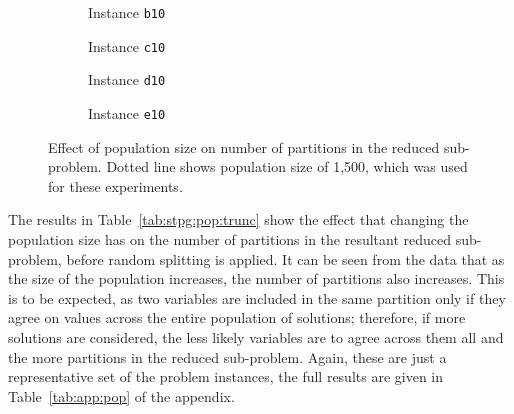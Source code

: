 \documentclass[journal]{IEEEtran}
\begin{document}
\begin{center}
\begin{figure}[ht]
    \centering
    \begin{subfigure}[t]{0.23\textwidth}
    \centering
    \caption{Instance \texttt{b10}}
    \label{fig:stpg_pop.1}
    \end{subfigure}
    \quad
    \begin{subfigure}[t]{0.23\textwidth}
    \centering
    \caption{Instance \texttt{c10}}
    \label{fig:stpg_pop.2}
    \end{subfigure}
    \quad
    \begin{subfigure}[t]{0.23\textwidth}
    \centering
    \caption{Instance \texttt{d10}}
    \label{fig:stpg_pop.3}
    \end{subfigure}
    \quad 
    \begin{subfigure}[t]{0.23\textwidth}
    \centering
    \caption{Instance \texttt{e10}}
    \label{fig:stpg_pop.4}
    \end{subfigure}
    \caption[Effect of population size on number of partitions in the reduced sub-problem]{Effect of population size on number of partitions in the reduced sub-problem. Dotted line shows population size of 1,500, which was used for these experiments.} 
    \label{fig:stpg_pop_plots}
\end{figure}
\end{center}
%
The results in Table~\ref{tab:stpg:pop:trunc} show the effect that changing the population size has on the number of partitions in the resultant reduced sub-problem, before random splitting is applied. It can be seen from the data that as the size of the population increases, the number of partitions also increases. This is to be expected, as two variables are included in the same partition only if they agree on values across the entire population of solutions; therefore, if more solutions are considered, the less likely variables are to agree across them all and the more partitions in the reduced sub-problem. Again, these are just a representative set of the problem instances, the full results are given in Table~\ref{tab:app:pop} of the appendix.
\end{document}
